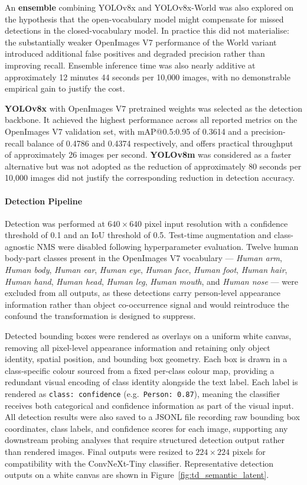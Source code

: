 An \textbf{ensemble} combining YOLOv8x and YOLOv8x-World was also explored on 
the hypothesis that the open-vocabulary model might compensate for missed 
detections in the closed-vocabulary model. In practice this did not materialise: 
the substantially weaker OpenImages V7 performance of the World variant 
introduced additional false positives and degraded precision rather than 
improving recall. Ensemble inference time was also nearly additive at 
approximately 12 minutes 44 seconds per 10{,}000 images, with no demonstrable 
empirical gain to justify the cost.

\textbf{YOLOv8x} with OpenImages V7 pretrained weights was selected as the 
detection backbone. It achieved the highest performance across all reported 
metrics on the OpenImages V7 validation set, with mAP@0.5:0.95 of 0.3614 and 
a precision-recall balance of 0.4786 and 0.4374 respectively, and offers 
practical throughput of approximately 26 images per second. \textbf{YOLOv8m} 
was considered as a faster alternative but was not adopted as the reduction of 
approximately 80 seconds per 10{,}000 images did not justify the corresponding 
reduction in detection accuracy.

\paragraph{Detection Pipeline}
Detection was performed at $640 \times 640$ pixel input resolution with a 
confidence threshold of 0.1 and an IoU threshold of 0.5. Test-time augmentation 
and class-agnostic NMS were disabled following hyperparameter evaluation. Twelve 
human body-part classes present in the OpenImages V7 vocabulary — 
\textit{Human arm}, \textit{Human body}, \textit{Human ear}, \textit{Human eye}, 
\textit{Human face}, \textit{Human foot}, \textit{Human hair}, \textit{Human 
	hand}, \textit{Human head}, \textit{Human leg}, \textit{Human mouth}, and 
\textit{Human nose} — were excluded from all outputs, as these detections carry 
person-level appearance information rather than object co-occurrence signal and 
would reintroduce the confound the transformation is designed to suppress.

Detected bounding boxes were rendered as overlays on a uniform white canvas, 
removing all pixel-level appearance information and retaining only object 
identity, spatial position, and bounding box geometry. Each box is drawn in a 
class-specific colour sourced from a fixed per-class colour map, providing a 
redundant visual encoding of class identity alongside the text label. Each label 
is rendered as \texttt{class: confidence} (e.g.\ \texttt{Person: 0.87}), meaning 
the classifier receives both categorical and confidence information as part of 
the visual input. All detection results were also saved to a JSONL file recording 
raw bounding box coordinates, class labels, and confidence scores for each image, 
supporting any downstream probing analyses that require structured detection 
output rather than rendered images. Final outputs were resized to $224 \times 
224$ pixels for compatibility with the ConvNeXt-Tiny classifier. Representative detection outputs on a white canvas are shown in Figure~\ref{fig:td_semantic_latent}.

